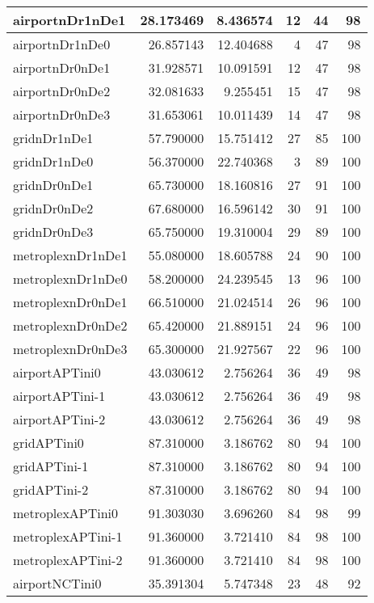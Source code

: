 \begin{longtable}{|l|r|r|r|r|r|}
\endlastfoot
airportnDr1nDe1 & 28.173469 & 8.436574 & 12 & 44 & 98 \\ \hline
airportnDr1nDe0 & 26.857143 & 12.404688 & 4 & 47 & 98 \\ \hline
airportnDr0nDe1 & 31.928571 & 10.091591 & 12 & 47 & 98 \\ \hline
airportnDr0nDe2 & 32.081633 & 9.255451 & 15 & 47 & 98 \\ \hline
airportnDr0nDe3 & 31.653061 & 10.011439 & 14 & 47 & 98 \\ \hline
gridnDr1nDe1 & 57.790000 & 15.751412 & 27 & 85 & 100 \\ \hline
gridnDr1nDe0 & 56.370000 & 22.740368 & 3 & 89 & 100 \\ \hline
gridnDr0nDe1 & 65.730000 & 18.160816 & 27 & 91 & 100 \\ \hline
gridnDr0nDe2 & 67.680000 & 16.596142 & 30 & 91 & 100 \\ \hline
gridnDr0nDe3 & 65.750000 & 19.310004 & 29 & 89 & 100 \\ \hline
metroplexnDr1nDe1 & 55.080000 & 18.605788 & 24 & 90 & 100 \\ \hline
metroplexnDr1nDe0 & 58.200000 & 24.239545 & 13 & 96 & 100 \\ \hline
metroplexnDr0nDe1 & 66.510000 & 21.024514 & 26 & 96 & 100 \\ \hline
metroplexnDr0nDe2 & 65.420000 & 21.889151 & 24 & 96 & 100 \\ \hline
metroplexnDr0nDe3 & 65.300000 & 21.927567 & 22 & 96 & 100 \\ \hline
airportAPTini0 & 43.030612 & 2.756264 & 36 & 49 & 98 \\ \hline
airportAPTini-1 & 43.030612 & 2.756264 & 36 & 49 & 98 \\ \hline
airportAPTini-2 & 43.030612 & 2.756264 & 36 & 49 & 98 \\ \hline
gridAPTini0 & 87.310000 & 3.186762 & 80 & 94 & 100 \\ \hline
gridAPTini-1 & 87.310000 & 3.186762 & 80 & 94 & 100 \\ \hline
gridAPTini-2 & 87.310000 & 3.186762 & 80 & 94 & 100 \\ \hline
metroplexAPTini0 & 91.303030 & 3.696260 & 84 & 98 & 99 \\ \hline
metroplexAPTini-1 & 91.360000 & 3.721410 & 84 & 98 & 100 \\ \hline
metroplexAPTini-2 & 91.360000 & 3.721410 & 84 & 98 & 100 \\ \hline
airportNCTini0 & 35.391304 & 5.747348 & 23 & 48 & 92 \\ \hline

\end{longtable}
